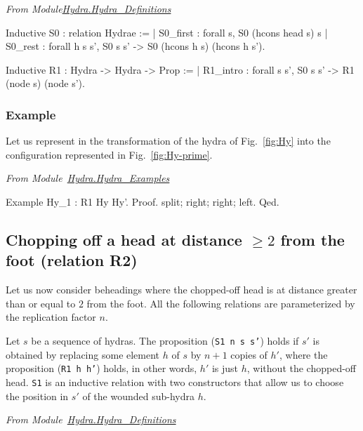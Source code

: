 \vspace{4pt}\emph{From Module\href{../theories/html/hydras.Hydra.Hydra_Definitions.html}{Hydra.Hydra\_Definitions}}

\begin{Coqsrc}
Inductive S0 :  relation Hydrae :=
| S0_first : forall s, S0  (hcons head s) s
| S0_rest : forall  h s s',  S0  s s' ->
                             S0  (hcons h s) (hcons h s').

Inductive R1  :  Hydra -> Hydra -> Prop :=
| R1_intro : forall s s', S0 s s' -> R1 (node s) (node s').
\end{Coqsrc}

\subsubsection{Example}
\label{sec:orgheadline45}

Let us represent in \coq{}   the transformation of the hydra of Fig.~\vref{fig:Hy} into
the configuration represented in Fig.~\ref{fig:Hy-prime}.

\vspace{4pt}
\emph{From Module~\href{../theories/html/hydras.Hydra.Hydra_Examples.html}{Hydra.Hydra\_Examples}}


\begin{Coqsrc}
Example Hy_1 : R1 Hy Hy'.
Proof. 
  split; right; right; left.
Qed.
\end{Coqsrc}


\subsection{Chopping off a head at distance \texorpdfstring{$\geq 2$}{>= 2} from the foot (relation R2) }


Let us now consider beheadings  where the chopped-off head is at distance greater than or equal to $2$ from the foot. All the following relations are parameterized by the replication factor  $n$.

 Let $s$ be a sequence of hydras. 
The proposition (\texttt{S1 n s s'}) holds if $s'$ is obtained by replacing some element $h$ of $s$ by 
$n+1$ copies of $h'$, where  the proposition (\texttt{R1 h h'}) holds, in other words, $h'$ is just $h$, without the chopped-off  head. \texttt{S1} is an inductive relation with two constructors that allow us to choose the position in $s'$ of the wounded sub-hydra $h$.

\vspace{4pt}
\noindent
\emph{From Module~\href{../theories/html/hydras.Hydra.Hydra_Definitions.html\#S1}{Hydra.Hydra\_Definitions}}

